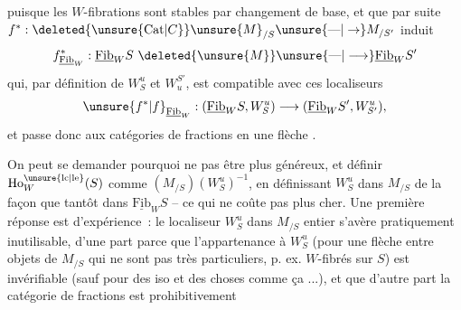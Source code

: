 
puisque les $W$-fibrations sont stables par changement de base, et que par suite $f^*: \deleted{\unsure{\mathrm{Cat}|C}}\unsure{M}_{/S}\unsure{\text{---}|\to}M_{/S'}$ induit
\[
f^*_{\underline{\mathrm{Fib}}_W}:\underline{\mathrm{Fib}}_W S\ \deleted{\unsure{M}}\unsure{\text{---}|\longrightarrow}\underline{\mathrm{Fib}}_W S'
\]
qui, par définition de $W_S^u$ et $W_u^{S'}$, est compatible avec ces localiseurs
\[
\unsure{f^{*}|f}_{\underline{\mathrm{Fib}}_W}:(\underline{\mathrm{Fib}}_W S,W_S^u)\longrightarrow(\underline{\mathrm{Fib}}_W S',W_{S'}^u),
\]
et passe donc aux catégories de fractions en une flèche .

On peut se demander pourquoi ne pas être plus généreux, et définir $\mathrm{Ho}^{\unsure{\mathrm{lc}|\mathrm{le}}}_W(S)$ comme $(M_{/S})(W_S^u)^{-1}$, en définissant $W_S^u$ dans $M_{/S}$ de la  façon que tantôt dans $\underline{\mathrm{Fib}}_W S$ -- ce qui ne coûte pas plus cher. Une première réponse est d'expérience~: le localiseur $W_S^u$ dans $M_{/S}$  entier s'avère pratiquement inutilisable, d'une part parce que l'appartenance à $W_S^u$ (pour une flèche entre objets de $M_{/S}$ qui ne sont pas très particuliers, p. ex. $W$-fibrés sur $S$) est  invérifiable (sauf pour des iso et des choses comme ça ...), et que d'autre part la catégorie de fractions est prohibitivement
